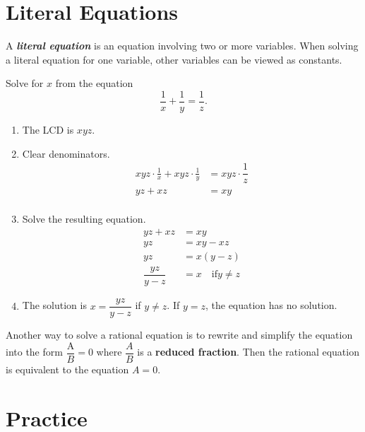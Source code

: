 \documentclass[en,12pt]{elegantbook}
\providecommand{\tightlist}{%
  \setlength{\itemsep}{0pt}\setlength{\parskip}{0pt}}
\newenvironment{rmdnote}{
    \par\noindent
    \makebox[-\width][r]{
    \tiny\color{red!90}
    \textdbend
    \hspace*{2pt}
    }
    \makebox[\width][l]{
        \hspace*{3pt}
        \textbf{
            \color{second}
            Note 
        }
    }
    \begin{shaded}
    \itshape
}{
    \par
    \end{shaded}
}
\providecommand{\tightlist}{%
  \setlength{\itemsep}{0pt}\setlength{\parskip}{0pt}}
\let\BeginKnitrBlock\begin \let\EndKnitrBlock\end
\begin{document}
\hypertarget{literal-equations}{%
\section{Literal Equations}\label{literal-equations}}

A \textbf{\emph{literal equation}} is an equation involving two or more variables. When solving a literal equation for one variable, other variables can be viewed as constants.

\BeginKnitrBlock{example}
\protect\hypertarget{exm:unnamed-chunk-145}{}{\label{exm:unnamed-chunk-145} }
Solve for \(x\) from the equation
\[
\frac{1}{x}+\frac{1}{y}=\dfrac{1}{z}.
\]
\EndKnitrBlock{example}

\BeginKnitrBlock{solution}


\begin{enumerate}
\def\labelenumi{\arabic{enumi}.}
\tightlist
\item
  The LCD is \(xyz\).
\item
  Clear denominators.
  \[
       \begin{aligned}
           xyz\cdot\frac{1}{x}+xyz\cdot\frac{1}{y}&=xyz\cdot\dfrac{1}{z}\\
           yz+xz&=xy\\
       \end{aligned}
   \]
\item
  Solve the resulting equation.
  \[
       \begin{aligned}
           yz+xz&=xy\\
           yz&=xy-xz\\
           yz&=x(y-z)\\
           \dfrac{yz}{y-z}&=x \quad \text{if} y\neq z
       \end{aligned}
   \]
\item
  The solution is \(x=\dfrac{yz}{y-z}\) if \(y\neq z\). If \(y=z\), the equation has no solution.
\end{enumerate}
\EndKnitrBlock{solution}

\begin{rmdnote}

Another way to solve a rational equation is to rewrite and simplify the equation into the form \(\dfrac{\text{A}}{B}=0\) where \(\dfrac{A}{B}\) is a \textbf{reduced fraction}. Then the rational equation is equivalent to the equation \(A=0\).

\end{rmdnote}

\hypertarget{practice-6}{%
\section{Practice}\label{practice-6}}
\end{document}
